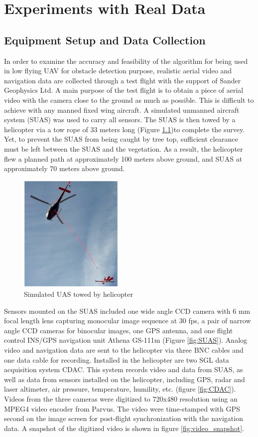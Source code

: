 \chapter{Experiments with Real Data}
\section{Equipment Setup and Data Collection}
In order to examine the accuracy and feasibility of the algorithm for
being used in low flying UAV for obstacle detection purpose, realistic
aerial video and navigation data are collected through a test flight
with the support of Sander Geophysics Ltd. A main purpose of the test
flight is to obtain a piece of aerial video with the camera close to
the ground as much as possible. This is difficult to achieve with any
manned fixed wing aircraft. A simulated unmanned aircraft
system (SUAS) was used to carry all sensors. The SUAS is then towed by
a helicopter via a tow rope of 33 meters long (Figure
\ref{fig:towedSUAS})to complete the survey. Yet, to prevent the SUAS
from being caught by tree top, sufficient clearance must be left
between the SUAS and the vegetation. As a result, the helicopter flew
a planned path at approximately 100 meters above ground, and SUAS at
approximately 70 meters above ground.

\begin{figure}[h]
\centering
\includegraphics[width=5cm,keepaspectratio=true]{./Figures/towed_SUAS.jpg}
\caption{Simulated UAS towed by helicopter}
\label{fig:towedSUAS}
\end{figure}
\FloatBarrier
Sensors mounted on the SUAS included one wide angle CCD camera with 6
mm focal length lens capturing monocular image sequence at 30 fps, a
pair of narrow angle CCD cameras for binocular images, one GPS
antenna, and one flight control INS/GPS navigation unit Athena GS-111m
\cite{_athena_????} (Figure \ref{fig:SUAS}). Analog video and
navigation data are sent to the helicopter via three BNC cables and
one data cable for recording. Installed in the helicopter are two SGL
data acquisition system CDAC. This system records video and data from
SUAS, as well as data from sensors installed on the helicopter,
including GPS, radar and laser altimeter, air pressure, temperature,
humility, etc. (figure \ref{fig:CDAC}). Videos from the three cameras
were digitized to 720x480 resolution using an MPEG4 video encoder from
Parvus. The video were time-stamped with GPS second on the image
screen for post-flight synchronization with the navigation data. A
snapshot of the digitized video is shown in figure
\ref{fig:video_snapshot}.

